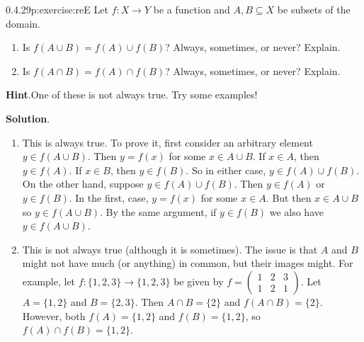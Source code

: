 \documentclass[twoside,11pt,]{book}
\newcommand{\blocktitlefont}{\relax}
\numberwithin{equation}{chapter}
\newcommand{\twoline}[2]{\begin{pmatrix}#1 \\ #2 \end{pmatrix}}
\newcommand{\amp}{&}
\begin{document}
\begin{divisionsolution}{0.4.29}{}{p:exercise:reE}%
Let \(f:X \to Y\) be a function and \(A, B \subseteq X\) be subsets of the domain.%
\begin{enumerate}[label=(\alph*)]
\item{}Is \(f(A \cup B) = f(A) \cup f(B)\)? Always, sometimes, or never? Explain.%
\item{}Is \(f(A \cap B) = f(A) \cap f(B)\)? Always, sometimes, or never? Explain.%
\end{enumerate}
%
\par\smallskip%
\noindent\textbf{\blocktitlefont Hint}.\quad{}One of these is not always true.  Try some examples!%
\par\smallskip%
\noindent\textbf{\blocktitlefont Solution}.\quad{}%
\begin{enumerate}[label=(\alph*)]
\item{}This is always true. To prove it, first consider an arbitrary element \(y \in f(A \cup B)\). Then \(y = f(x)\) for some \(x \in A \cup B\). If \(x \in A\), then \(y \in f(A)\). If \(x \in B\), then \(y \in f(B)\). So in either case, \(y \in f(A) \cup f(B)\). On the other hand, suppose \(y \in f(A) \cup f(B)\). Then \(y \in f(A)\) or \(y \in f(B)\). In the first, case, \(y = f(x)\) for some \(x \in A\). But then \(x \in A \cup B\) so \(y \in f(A \cup B)\). By the same argument, if \(y \in f(B)\) we also have \(y \in f(A \cup B)\).%
\item{}This is not always true (although it is sometimes). The issue is that \(A\) and \(B\) might not have much (or anything) in common, but their images might. For example, let \(f:\{1,2,3\} \to \{1,2,3\}\) be given by \(f= \twoline{1 \amp 2 \amp 3}{1 \amp 2 \amp 1}\). Let \(A = \{1, 2\}\) and \(B = \{2, 3\}\). Then \(A \cap B = \{2\}\) and \(f(A \cap B) = \{2\}\). However, both \(f(A) = \{1,2\}\) and \(f(B) = \{1,2\}\), so \(f(A) \cap f(B) = \{1,2\}\).%
\end{enumerate}
%
\end{divisionsolution}%
\end{document}
